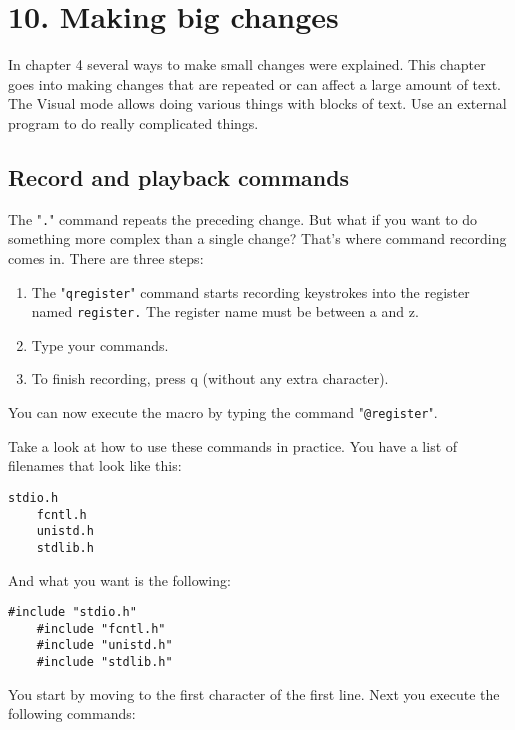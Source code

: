 \section{10. Making big changes}
In chapter 4 several ways to make small changes were explained.  This chapter
goes into making changes that are repeated or can affect a large amount of
text.  The Visual mode allows doing various things with blocks of text.  Use
an external program to do really complicated things.
\subsection{Record and playback commands}
The "\texttt{.}" command repeats the preceding change.
But what if you want to do something more complex than a single change?  That's where command recording comes in.
There are three steps:

\begin{enumerate}
				\item The "\texttt{q{register}}" command starts recording keystrokes into the register named \texttt{{register}.}
								The register name must be between a and z.
				\item Type your commands.
				\item To finish recording, press q (without any extra character).
\end{enumerate}

You can now execute the macro by typing the command "\texttt{@{register}}".

Take a look at how to use these commands in practice.
You have a list of filenames that look like this:

\begin{Verbatim}[samepage=true]
    stdio.h 
    fcntl.h 
    unistd.h 
    stdlib.h 
\end{Verbatim}

And what you want is the following:

\begin{Verbatim}[samepage=true]
    #include "stdio.h" 
    #include "fcntl.h" 
    #include "unistd.h" 
    #include "stdlib.h" 
\end{Verbatim}

You start by moving to the first character of the first line.
Next you execute the following commands:

